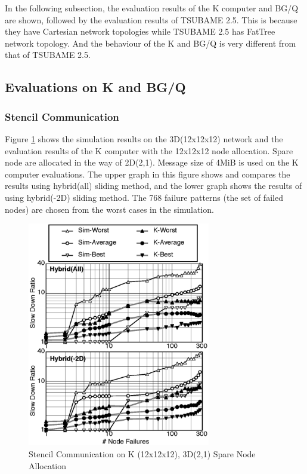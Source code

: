 \documentclass[Afour,times,sagev]{sagej}
\begin{document}
In the following subsection, the evaluation results of the K computer
and BG/Q are shown, followed by the evaluation results of TSUBAME
2.5. This is because they have Cartesian network topologies 
while TSUBAME 2.5 has FatTree network topology. And the behaviour of
the K and BG/Q is very different from that of TSUBAME 2.5.

\subsection{Evaluations on K and BG/Q}

\subsubsection{Stencil Communication}

Figure \ref{fig:k-stencil} shows the simulation results on the
3D(12x12x12) network and the evaluation results of the K computer with
the 12x12x12 node allocation. Spare node are allocated in the way of
2D(2,1). Message size of 4MiB is used on the K computer
evaluations. The upper graph in this figure shows and compares the
results using hybrid(all) sliding method, and the lower graph shows
the results of using hybrid(-2D) sliding method. The 768 failure
patterns (the set of failed nodes) are chosen from the worst cases in
the simulation.

\begin{figure}[ht]
\centering
\includegraphics[width=80mm]{Figs/K-Stencil.eps}
  \caption{Stencil Communication on K (12x12x12), 3D(2,1) Spare Node
    Allocation}
  \label{fig:k-stencil}
\end{figure}
\end{document}
